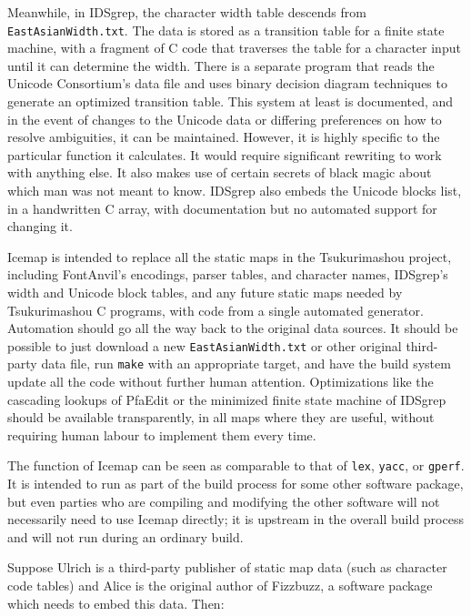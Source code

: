 \documentclass{mitsuba}
\begin{document}
Meanwhile, in IDSgrep, the character width table descends from
\texttt{EastAsianWidth.txt}.  The data is stored as a transition table for a
finite state machine, with a fragment of C code that traverses the table for
a character input until it can determine the width.  There is a separate
program that reads the Unicode Consortium's data file and uses binary
decision diagram techniques to generate an optimized transition table.  This
system at least is documented, and in the event of changes to the
Unicode data or differing preferences on how to resolve ambiguities, it can
be maintained.  However, it is highly specific to the particular function it
calculates.  It would require significant rewriting to work with anything
else.  It also makes use of certain secrets of black magic about which man
was not meant to know.  IDSgrep also embeds the Unicode blocks list, in
a handwritten C array, with documentation but no automated support for
changing it.

Icemap is intended to replace all the static maps in the Tsukurimashou
project, including FontAnvil's encodings, parser tables, and character
names, IDSgrep's width and Unicode block tables, and any future static maps
needed by Tsukurimashou C programs, with code from a single automated
generator.  Automation should go all the way back to the original data
sources.  It should be possible to just download a new
\texttt{EastAsianWidth.txt} or other original third-party data file, run
\texttt{make} with an appropriate target, and have the build system update
all the code without further human attention.  Optimizations like the
cascading lookups of PfaEdit or the minimized finite state machine of
IDSgrep should be available transparently, in all maps where they are
useful, without requiring human labour to implement them every time.

The function of Icemap can be seen as comparable to that of \texttt{lex},
\texttt{yacc}, or \texttt{gperf}.  It is intended to run as part of the
build process for some other software package, but even parties who are
compiling and modifying the other software will not necessarily need to use
Icemap directly; it is upstream in the overall build process and will not
run during an ordinary build.

Suppose Ulrich is a third-party publisher of
static map data (such as character code tables) and Alice is the original
author of Fizzbuzz, a software package which needs to embed this data.  Then:
\end{document}
